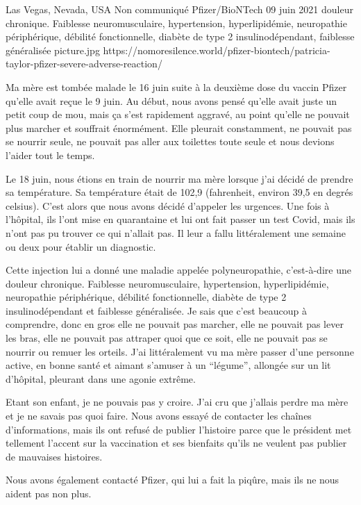 {Las Vegas, Nevada, USA}
{Non communiqué}
{Pfizer/BioNTech}
{09 juin 2021}
{douleur chronique. Faiblesse neuromusculaire, hypertension, hyperlipidémie, neuropathie périphérique, débilité fonctionnelle, diabète de type 2 insulinodépendant, faiblesse généralisée}
{picture.jpg}
{https://nomoresilence.world/pfizer-biontech/patricia-taylor-pfizer-severe-adverse-reaction/}
{

Ma mère est tombée malade le 16 juin suite à la deuxième dose du vaccin Pfizer
qu'elle avait reçue le 9 juin. Au début, nous avons pensé qu'elle avait juste un
petit coup de mou, mais ça s'est rapidement aggravé, au point qu'elle ne pouvait
plus marcher et souffrait énormément. Elle pleurait constamment, ne pouvait pas
se nourrir seule, ne pouvait pas aller aux toilettes toute seule et nous devions
l'aider tout le temps.

Le 18 juin, nous étions en train de nourrir ma mère lorsque j'ai décidé de
prendre sa température. Sa température était de 102,9 (fahrenheit, environ 39,5
en degrés celsius). C'est alors que nous avons décidé d'appeler les
urgences. Une fois à l'hôpital, ils l'ont mise en quarantaine et lui ont fait
passer un test Covid, mais ils n'ont pas pu trouver ce qui n'allait pas. Il leur
a fallu littéralement une semaine ou deux pour établir un diagnostic.

Cette injection lui a donné une maladie appelée polyneuropathie, c'est-à-dire
une douleur chronique. Faiblesse neuromusculaire, hypertension, hyperlipidémie,
neuropathie périphérique, débilité fonctionnelle, diabète de type 2
insulinodépendant et faiblesse généralisée. Je sais que c'est beaucoup à
comprendre, donc en gros elle ne pouvait pas marcher, elle ne pouvait pas lever
les bras, elle ne pouvait pas attraper quoi que ce soit, elle ne pouvait pas se
nourrir ou remuer les orteils. J'ai littéralement vu ma mère passer d'une
personne active, en bonne santé et aimant s'amuser à un “légume”, allongée sur
un lit d'hôpital, pleurant dans une agonie extrême.

Etant son enfant, je ne pouvais pas y croire. J'ai cru que j'allais perdre ma
mère et je ne savais pas quoi faire. Nous avons essayé de contacter les chaînes
d'informations, mais ils ont refusé de publier l'histoire parce que le président
met tellement l'accent sur la vaccination et ses bienfaits qu'ils ne veulent pas
publier de mauvaises histoires.

Nous avons également contacté Pfizer, qui lui a fait la piqûre, mais ils ne nous
aident pas non plus.

}
